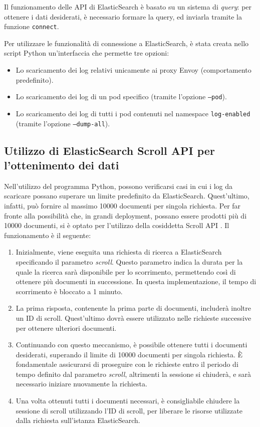 Il funzionamento delle API di ElasticSearch è basato su un sistema di \textit{query}: per ottenere i dati desiderati, è necessario formare la query, ed inviarla tramite la funzione \texttt{connect}.

Per utilizzare le funzionalità di connessione a ElasticSearch, è stata creata nello script Python un'interfaccia che permette tre opzioni:
\begin{itemize}
    \item Lo scaricamento dei log relativi unicamente ai proxy Envoy (comportamento predefinito).
    \item Lo scaricamento dei log di un pod specifico (tramite l'opzione \texttt{--pod}).
    \item Lo scaricamento dei log di tutti i pod contenuti nel namespace \verb|log-enabled| (tramite l'opzione \texttt{--dump-all}).
\end{itemize}

\subsection{Utilizzo di ElasticSearch Scroll API per l'ottenimento dei dati}
Nell'utilizzo del programma Python, possono verificarsi casi in cui i log da scaricare possano superare un limite predefinito da ElasticSearch. Quest'ultimo, infatti, può fornire al massimo 10000 documenti per singola richiesta. Per far fronte alla possibilità che, in grandi deployment, possano essere prodotti più di 10000 documenti, si è optato per l'utilizzo della cosiddetta Scroll API \cite{scroll_api}. Il funzionamento è il seguente:
\begin{enumerate}
\item Inizialmente, viene eseguita una richiesta di ricerca a ElasticSearch specificando il parametro \textit{scroll}. Questo parametro indica la durata per la quale la ricerca sarà disponibile per lo scorrimento, permettendo così di ottenere più documenti in successione. In questa implementazione, il tempo di scorrimento è bloccato a 1 minuto.
\item La prima risposta, contenente la prima parte di documenti, includerà inoltre un ID di scroll. Quest'ultimo dovrà essere utilizzato nelle richieste successive per ottenere ulteriori documenti.

\item Continuando con questo meccanismo, è possibile ottenere tutti i documenti desiderati, superando il limite di 10000 documenti per singola richiesta. È fondamentale assicurarsi di proseguire con le richieste entro il periodo di tempo definito dal parametro \textit{scroll}, altrimenti la sessione si chiuderà, e sarà necessario iniziare nuovamente la richiesta.

\item Una volta ottenuti tutti i documenti necessari, è consigliabile chiudere la sessione di scroll utilizzando l'ID di scroll, per liberare le risorse utilizzate dalla richiesta sull'istanza ElasticSearch.

\end{enumerate}

